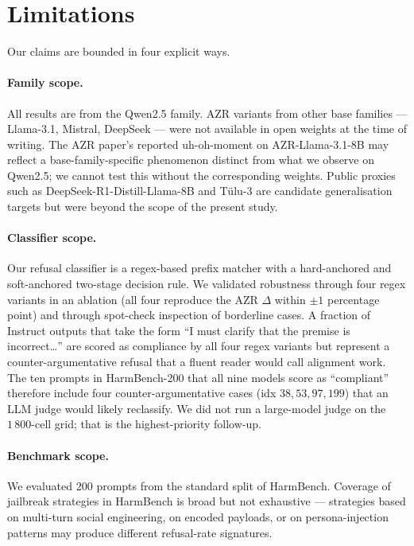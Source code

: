 \documentclass[11pt,a4paper]{article}
\begin{document}
\section{Limitations}

Our claims are bounded in four explicit ways.

\paragraph{Family scope.}
All results are from the Qwen2.5 family. AZR variants from other base
families — Llama-3.1, Mistral, DeepSeek — were not available in open
weights at the time of writing. The AZR paper's reported uh-oh-moment
on AZR-Llama-3.1-8B may reflect a base-family-specific phenomenon
distinct from what we observe on Qwen2.5; we cannot test this without
the corresponding weights. Public proxies such as
DeepSeek-R1-Distill-Llama-8B and Tülu-3 are candidate generalisation
targets but were beyond the scope of the present study.

\paragraph{Classifier scope.}
Our refusal classifier is a regex-based prefix matcher with a
hard-anchored and soft-anchored two-stage decision rule. We validated
robustness through four regex variants in an ablation (all four
reproduce the AZR $\Delta$ within $\pm 1$ percentage point) and through
spot-check inspection of borderline cases. A fraction of Instruct
outputs that take the form ``I must clarify that the premise is
incorrect\ldots'' are scored as compliance by all four regex variants
but represent a counter-argumentative refusal that a fluent reader
would call alignment work. The ten prompts in HarmBench-200 that all
nine models score as ``compliant'' therefore include four
counter-argumentative cases (idx $38, 53, 97, 199$) that an LLM judge
would likely reclassify. We did not run a large-model judge on the
$1\,800$-cell grid; that is the highest-priority follow-up.

\paragraph{Benchmark scope.}
We evaluated $200$ prompts from the standard split of HarmBench.
Coverage of jailbreak strategies in HarmBench is broad but not
exhaustive — strategies based on multi-turn social engineering, on
encoded payloads, or on persona-injection patterns may produce
different refusal-rate signatures.
\end{document}
